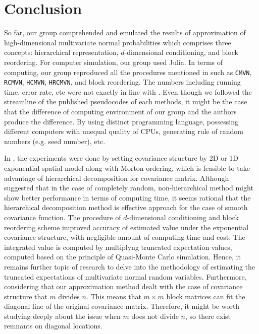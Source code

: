 \section{Conclusion}

So far, our group comprehended and emulated the results of approximation of high-dimensional multivariate normal probabilities which comprises three concepts: hierarchical representation, $d$-dimensional conditioning, and block reordering. For computer simulation, our group used Julia. In terms of computing, our group reproduced all the procedures mentioned in \citet{cao2019hierarchical} such as \texttt{CMVN}, \texttt{RCMVN}, \texttt{HCMVN}, \texttt{HRCMVN}, and block reordering. The numbers including running time, error rate, etc were not exactly in line with \citet{cao2019hierarchical}. Even though we followed the streamline of the published pseudocodes of each methods, it might be the case that the difference of computing environment of our group and the authors produce the difference. By using distinct programming language, possessing different computers with unequal quality of CPUs, generating rule of random numbers (e.g. seed number), etc.

In \citet{cao2019hierarchical}, the experiments were done by setting covariance structure by 2D or 1D exponential spatial model along with Morton ordering, which is feasible to take advantage of hierarchical decomposition for covariance matrix. Although \citet{cao2019hierarchical} suggested that in the case of completely random, non-hierarchical method might show better performance in terms of computing time, it seems rational that the hierarchical decomposition method is effective approach for the case of smooth covariance function. The procedure of $d$-dimensional conditioning and block reordering scheme improved accuracy of estimated value under the exponential covariance structure, with negligible amount of computing time and cost. The integrated value is computed by multiplyng truncated expectation values, computed based on the principle of Quasi-Monte Carlo simulation. Hence, it remains further topic of research to delve into the methodology of estimating the truncated expectations of multivariate normal random variables. Furthermore, considering that our approximation method dealt with the case of covariance structure that $m$ divides $n$. This means that $m \times m$ block matrices can fit the diagonal line of the original covariance matrix. Therefore, it might be worth studying deeply about the issue when $m$ does not divide $n$, so there exist remnants on diagonal locations.